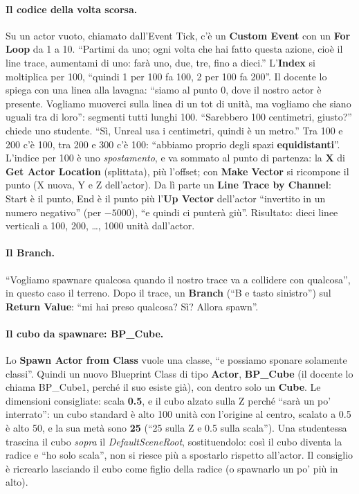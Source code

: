 \paragraph{Il codice della volta scorsa.} Su un actor vuoto, chiamato dall'Event Tick,
c'è un \textbf{Custom Event} con un \textbf{For Loop} da 1 a 10. ``Partimi da uno; ogni
volta che hai fatto questa azione, cioè il line trace, aumentami di uno: farà uno, due,
tre, fino a dieci.'' L'\textbf{Index} si moltiplica per 100, ``quindi 1 per 100 fa 100,
2 per 100 fa 200''. Il docente lo spiega con una linea alla lavagna: ``siamo al punto 0,
dove il nostro actor è presente. Vogliamo muoverci sulla linea di un tot di unità, ma
vogliamo che siano uguali tra di loro'': segmenti tutti lunghi 100. ``Sarebbero 100
centimetri, giusto?'' chiede uno studente. ``Sì, Unreal usa i centimetri, quindi è un
metro.'' Tra 100 e 200 c'è 100, tra 200 e 300 c'è 100: ``abbiamo proprio degli spazi
\textbf{equidistanti}''. L'indice per 100 è uno \emph{spostamento}, e va sommato al punto
di partenza: la \textbf{X} di \textbf{Get Actor Location} (splittata), più l'offset; con
\textbf{Make Vector} si ricompone il punto (X nuova, Y e Z dell'actor). Da lì parte un
\textbf{Line Trace by Channel}: Start è il punto, End è il punto più l'\textbf{Up Vector}
dell'actor ``invertito in un numero negativo'' (per $-5000$), ``e quindi ci punterà
giù''. Risultato: dieci linee verticali a 100, 200, \ldots, 1000 unità dall'actor.

\paragraph{Il Branch.} ``Vogliamo spawnare qualcosa quando il nostro trace va a collidere
con qualcosa'', in questo caso il terreno. Dopo il trace, un \textbf{Branch} (``B e tasto
sinistro'') sul \textbf{Return Value}: ``mi hai preso qualcosa? Sì? Allora spawn''.

\paragraph{Il cubo da spawnare: BP\_Cube.} Lo \textbf{Spawn Actor from Class} vuole una
classe, ``e possiamo sponare solamente classi''. Quindi un nuovo Blueprint Class di tipo
\textbf{Actor}, \textbf{BP\_Cube} (il docente lo chiama BP\_Cube1, perché il suo esiste
già), con dentro solo un \textbf{Cube}. Le dimensioni consigliate: scala \textbf{0.5}, e
il cubo alzato sulla Z perché ``sarà un po' interrato'': un cubo standard è alto 100
unità con l'origine al centro, scalato a 0.5 è alto 50, e la sua metà sono \textbf{25}
(``25 sulla Z e 0.5 sulla scala''). Una studentessa trascina il cubo \emph{sopra} il
\emph{DefaultSceneRoot}, sostituendolo: così il cubo diventa la radice e ``ho solo
scala'', non si riesce più a spostarlo rispetto all'actor. Il consiglio è ricrearlo
lasciando il cubo come figlio della radice (o spawnarlo un po' più in alto).

